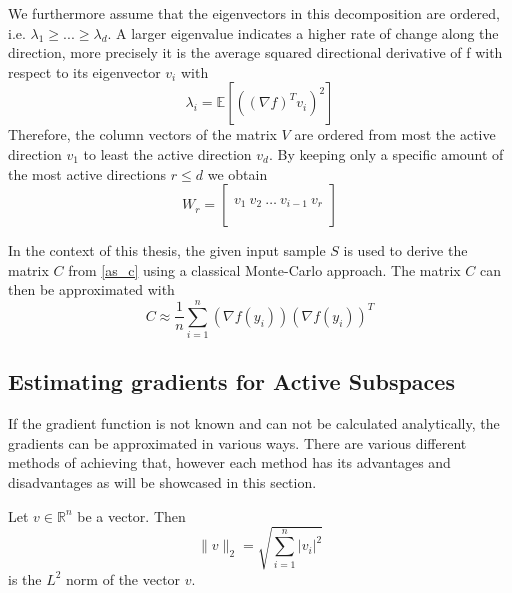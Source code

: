 \documentclass[
  a4paper,  %
  twoside,  %
  bibliography=totoc,
  headsepline,
  cleardoublepage=empty,
  parskip=half,
  draft=false
]{scrbook}
\begin{document}
We furthermore assume that the eigenvectors in this decomposition are ordered, i.e. $\lambda_1 \geq ... \geq \lambda_d$.
A larger eigenvalue indicates a higher rate of change along the direction, more precisely it is the average squared directional derivative of f with respect to its eigenvector $v_i$ \cite{CG14} with
\begin{equation}
\lambda_i=\mathds{E}[((\nabla f)^T v_i)^2]
\label{eigenvalues}
\end{equation}
Therefore, the column vectors of the matrix $V$ are ordered from most the active direction $v_1$ to least the active direction $v_d$.
By keeping only a specific amount of the most active directions $r \leq d$ we obtain
\begin{equation}
W_r=\begin{bmatrix}
  \\
    v_1 ~ v_2 ~ \dots ~ v_{i-1} ~ v_r\\
    \\
  \end{bmatrix}
\label{basis}
\end{equation}

In the context of this thesis, the given input sample $S$ is used to derive the matrix $C$ from \ref{as_c} using a classical Monte-Carlo approach.
The matrix $C$ can then be approximated with
\begin{equation}
C \approx \frac{1}{n} \sum_{i=1}^n  (\nabla f(y_i)) (\nabla f(y_i))^T
\nonumber
\end{equation}




\subsection{Estimating gradients for Active Subspaces}

If the gradient function is not known and can not be calculated analytically, the gradients can be approximated in various ways.
There are various different methods of achieving that, however each method has its advantages and disadvantages as will be showcased in this section.

\begin{definition}[$L^2$ norm]
Let $v \in \mathds{R}^{n}$ be a vector. Then
\begin{equation}
\| v\|_2=\sqrt{\sum_{i=1}^n |v_{i}|^2}
\nonumber
\end{equation}
is the $L^2$ norm of the vector $v$.
\end{definition}
\end{document}
